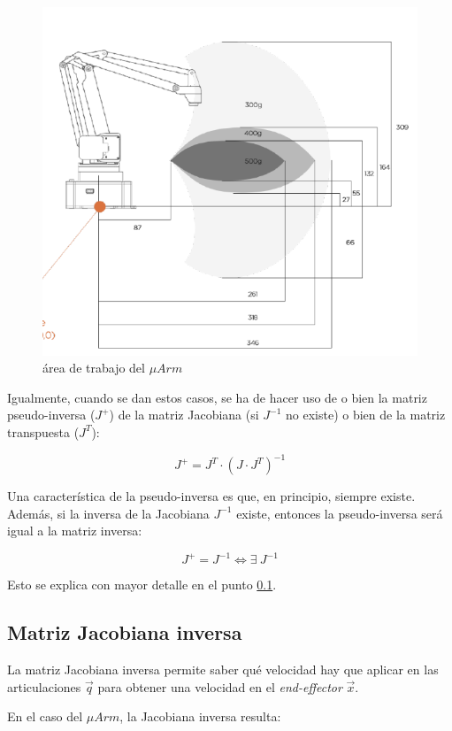 \documentclass[a4paper,12pt]{article}
\begin{document}
\begin{figure}[H]
    \centering
    \includegraphics[width=.41\linewidth]{images/arm_weights_distances.png}
    \caption{área de trabajo del $\mu Arm$ \cite{noauthor_uarm_2019-1}}
    \label{fig:working_area}
\end{figure}

Igualmente, cuando se dan estos casos, se ha de hacer uso de o bien la matriz pseudo-inversa
($J^+$) de la matriz Jacobiana (si $J^{-1}$ no existe) o bien de la matriz transpuesta ($J^T$):

\begin{equation} \label{eq:pinv}
    J^+ = J^T \cdot \left(J \cdot J^T\right)^{-1}
\end{equation}

Una característica de la pseudo-inversa es que, en principio, siempre existe. Además,
si la inversa de la Jacobiana $J^{-1}$ existe, entonces la pseudo-inversa será igual a
la matriz inversa:

\begin{equation} \label{eq:pinv_exists}
    J^+ = J^{-1} \Leftrightarrow \exists ~ J^{-1}
\end{equation}

Esto se explica con mayor detalle en el punto \ref{sec:inv_jacobian}.

\subsection{Matriz Jacobiana inversa}
\label{sec:inv_jacobian}

La matriz Jacobiana inversa permite saber qué velocidad hay que aplicar en las
articulaciones $\vec{q}$ para obtener una velocidad en el \textit{end-effector}
$\vec{x}$.

En el caso del $\mu Arm$, la Jacobiana inversa resulta:
\end{document}
